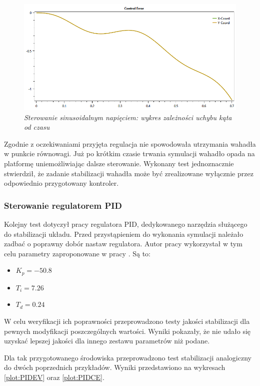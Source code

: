 \documentclass[12pt, twoside, openany]{report}
\theoremstyle{definition}
\begin{document}
\begin{figure}[H]
	\centering
		\includegraphics[width = 350pt]{SinusoidalCE} 
		\caption{\textit{Sterowanie sinusoidalnym napięciem: wykres zależności uchybu kąta od czasu}}
		\label{plot:SinusoidalCE}
\end{figure}

Zgodnie z oczekiwaniami przyjęta regulacja nie spowodowała utrzymania wahadła w punkcie równowagi. Już po krótkim czasie trwania symulacji wahadło opada na platformę uniemożliwiając dalsze sterowanie. Wykonany test jednoznacznie stwierdził, że zadanie stabilizacji wahadła może być zrealizowane wyłącznie przez odpowiednio przygotowany kontroler.

\subsubsection{Sterowanie regulatorem PID}
Kolejny test dotyczył pracy regulatora PID, dedykowanego narzędzia służącego do stabilizacji układu. Przed przystąpieniem do wykonania symulacji należało zadbać o poprawny dobór nastaw regulatora. Autor pracy wykorzystał w tym celu parametry zaproponowane w pracy \cite{JTJT}. Są to:
\begin{itemize}
\item $K_p = -50.8$
\item $T_i = 7.26$
\item $T_d = 0.24$
\end{itemize}

W celu weryfikacji ich poprawności przeprowadzono testy jakości stabilizacji dla pewnych modyfikacji poszczególnych wartości. Wyniki pokazały, że nie udało się uzyskać lepszej jakości dla innego zestawu parametrów niż podane.

Dla tak przygotowanego środowiska przeprowadzono test stabilizacji analogiczny do dwóch poprzednich przykładów. Wyniki przedstawiono na wykresach \ref{plot:PIDEV} oraz  \ref{plot:PIDCE}.
\end{document}

